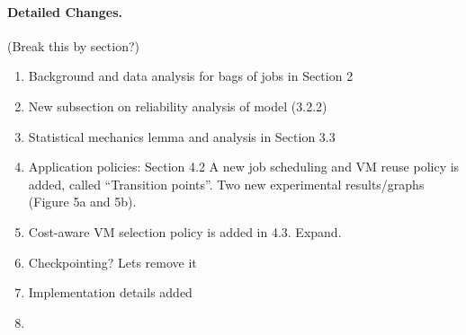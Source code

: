 \documentclass{article}
\begin{document}
\paragraph{Detailed Changes.}
(Break this by section?)
\begin{enumerate}
\item Background and data analysis for bags of jobs in Section 2 
\item New subsection on reliability analysis of model (3.2.2)
\item Statistical mechanics lemma and analysis in Section 3.3
\item Application policies: Section 4.2 A new job scheduling and VM reuse policy is added, called ``Transition points''. Two new experimental results/graphs (Figure 5a and 5b). 
\item Cost-aware VM selection policy is added in 4.3. Expand. 
\item Checkpointing? Lets remove it
\item Implementation details added
\item 
\end{enumerate}
\end{document}
